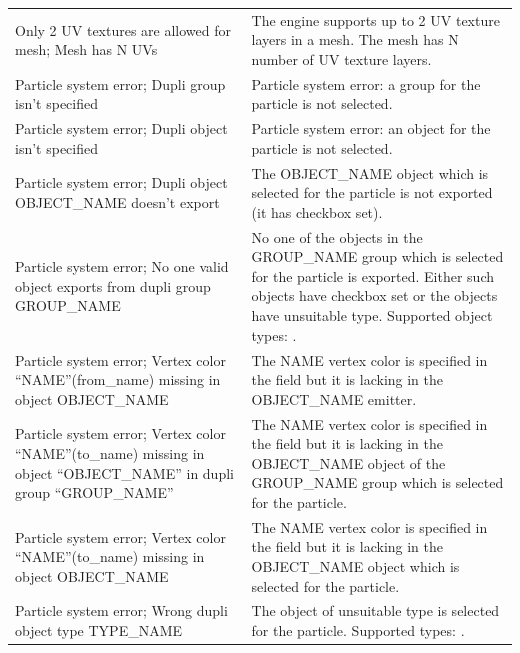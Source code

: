 \documentclass[a4paper,12pt,oneside]{sphinxmanual}
\begin{document}
\begin{tabulary}{\linewidth}{|L|L|}
\hline

Only 2 UV textures are allowed for
mesh; Mesh has N UVs
 & 
The engine supports up to 2 UV texture layers in a mesh. The mesh has N number of UV texture layers.
\\

Particle system error; Dupli group
isn't specified
 & 
Particle system error: a group for the particle is not selected.
\\

Particle system error; Dupli object
isn't specified
 & 
Particle system error: an object for the particle is not selected.
\\

Particle system error; Dupli object
OBJECT\_NAME doesn't export
 & 
The OBJECT\_NAME object which is selected for the particle is not exported (it has  checkbox set).
\\

Particle system error; No one valid
object exports from dupli group
GROUP\_NAME
 & 
No one of the objects in the GROUP\_NAME group which is selected for the particle is exported. Either such objects have  checkbox set or the objects have unsuitable type. Supported object types: .
\\

Particle system error; Vertex color
``NAME''(from\_name) missing in object
OBJECT\_NAME
 & 
The NAME vertex color is specified in the  field but it is lacking in the OBJECT\_NAME emitter.
\\

Particle system error; Vertex color
``NAME''(to\_name) missing in object
``OBJECT\_NAME'' in dupli group
``GROUP\_NAME''
 & 
The NAME vertex color is specified in the  field but it is lacking in the OBJECT\_NAME object of the GROUP\_NAME group which is selected for the particle.
\\

Particle system error; Vertex color
``NAME''(to\_name) missing in object
OBJECT\_NAME
 & 
The NAME vertex color is specified in the  field but it is lacking in the OBJECT\_NAME object which is selected for the particle.
\\

Particle system error; Wrong dupli
object type TYPE\_NAME
 & 
The object of unsuitable type is selected for the particle. Supported types: .
\\


\end{tabulary}
\end{document}
